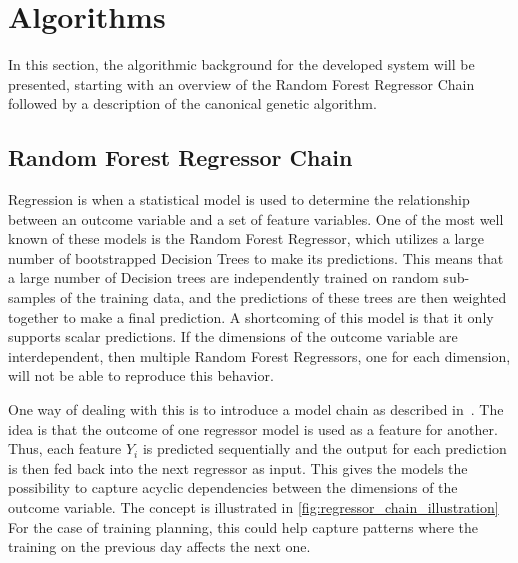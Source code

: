 \section{Algorithms}
In this section, the algorithmic background for the developed system will be presented, starting with an overview of the Random Forest Regressor Chain followed by a description of the canonical genetic algorithm.

\subsection{Random Forest Regressor Chain}
\label{sec:regressor_chain}
Regression is when a statistical model is used to determine the relationship between an outcome variable and a set of feature variables.
One of the most well known of these models is the Random Forest Regressor, which utilizes a large number of bootstrapped Decision Trees to make its predictions.
This means that a large number of Decision trees are independently trained on random sub-samples of the training data, and the predictions of these trees are then weighted together to make a final prediction.
A shortcoming of this model is that it only supports scalar predictions.
If the dimensions of the outcome variable are interdependent, then multiple Random Forest Regressors, one for each dimension, will not be able to reproduce this behavior.

One way of dealing with this is to introduce a model chain as described in~\cite{read2011classifier}.
The idea is that the outcome of one regressor model is used as a feature for another.
Thus, each feature $Y_i$ is predicted sequentially and the output for each prediction is then fed back into the next regressor as input.
This gives the models the possibility to capture acyclic dependencies between the dimensions of the outcome variable.
The concept is illustrated in \cref{fig:regressor_chain_illustration}
For the case of training planning, this could help capture patterns where the training on the previous day affects the next one.

